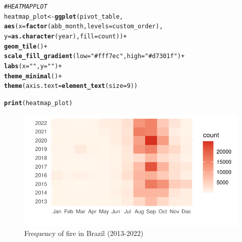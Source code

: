 \documentclass{article}\usepackage[]{graphicx}\usepackage[]{xcolor}
\makeatletter
\def\maxwidth{ %
  \ifdim\Gin@nat@width>\linewidth
    \linewidth
  \else
    \Gin@nat@width
  \fi
}
\newcommand{\hlnum}[1]{\textcolor[rgb]{0.686,0.059,0.569}{#1}}%
\newcommand{\hlstr}[1]{\textcolor[rgb]{0.192,0.494,0.8}{#1}}%
\newcommand{\hlcom}[1]{\textcolor[rgb]{0.678,0.584,0.686}{\textit{#1}}}%
\newcommand{\hlopt}[1]{\textcolor[rgb]{0,0,0}{#1}}%
\newcommand{\hlstd}[1]{\textcolor[rgb]{0.345,0.345,0.345}{#1}}%
\newcommand{\hlkwb}[1]{\textcolor[rgb]{0.69,0.353,0.396}{#1}}%
\newcommand{\hlkwc}[1]{\textcolor[rgb]{0.333,0.667,0.333}{#1}}%
\newcommand{\hlkwd}[1]{\textcolor[rgb]{0.737,0.353,0.396}{\textbf{#1}}}%
\newenvironment{kframe}{%
 \def\at@end@of@kframe{}%
 \ifinner\ifhmode%
  \def\at@end@of@kframe{\end{minipage}}%
  \begin{minipage}{\columnwidth}%
 \fi\fi%
 \def\FrameCommand##1{\hskip\@totalleftmargin \hskip-\fboxsep
 \colorbox{shadecolor}{##1}\hskip-\fboxsep
     \hskip-\linewidth \hskip-\@totalleftmargin \hskip\columnwidth}%
 \MakeFramed {\advance\hsize-\width
   \@totalleftmargin\z@ \linewidth\hsize
   \@setminipage}}%
 {\par\unskip\endMakeFramed%
 \at@end@of@kframe}
\newenvironment{knitrout}{}{} %
\numberwithin{equation}{section}
\makeatother
\begin{document}
\begin{knitrout}\scriptsize
{}\color{fgcolor}\begin{kframe}
\begin{alltt}
\hlcom{# HEATMAP PLOT}
\hlstd{heatmap_plot} \hlkwb{<-} \hlkwd{ggplot}\hlstd{(pivot_table,}
                       \hlkwd{aes}\hlstd{(}\hlkwc{x} \hlstd{=} \hlkwd{factor}\hlstd{(abb_month,} \hlkwc{levels} \hlstd{= custom_order),}
                           \hlkwc{y} \hlstd{=} \hlkwd{as.character}\hlstd{(year),} \hlkwc{fill} \hlstd{= count))} \hlopt{+}
  \hlkwd{geom_tile}\hlstd{()} \hlopt{+}
  \hlkwd{scale_fill_gradient}\hlstd{(}\hlkwc{low} \hlstd{=} \hlstr{"#fff7ec"}\hlstd{,} \hlkwc{high} \hlstd{=} \hlstr{"#d7301f"}\hlstd{)} \hlopt{+}
  \hlkwd{labs}\hlstd{(}\hlkwc{x} \hlstd{=} \hlstr{" "}\hlstd{,} \hlkwc{y} \hlstd{=} \hlstr{" "}\hlstd{)} \hlopt{+}
  \hlkwd{theme_minimal}\hlstd{()} \hlopt{+}
  \hlkwd{theme}\hlstd{(}\hlkwc{axis.text} \hlstd{=} \hlkwd{element_text}\hlstd{(}\hlkwc{size} \hlstd{=} \hlnum{9}\hlstd{))}

\hlkwd{print}\hlstd{(heatmap_plot)}
\end{alltt}
\end{kframe}\begin{figure}[H]

{\centering \includegraphics[width=\maxwidth]{figure/beamer-fire-by-months-fy13-22-1} 

}

\caption[Frequency of fire in Brazil (2013-2022)]{Frequency of fire in Brazil (2013-2022)}\label{fig:fire-by-months-fy13-22}
\end{figure}

\end{knitrout}
\end{document}
